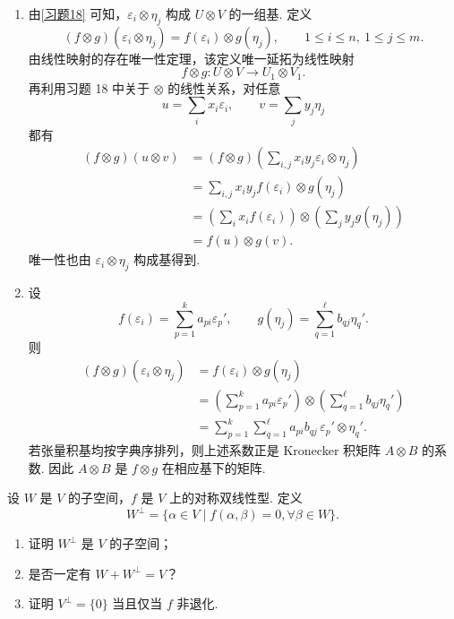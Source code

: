 \begin{solution}
	\begin{enumerate}
		\item 由\ref{习题18} 可知，$\varepsilon_i\otimes\eta_j$ 构成 $U\otimes V$ 的一组基. 定义
		\[
		(f\otimes g)(\varepsilon_i\otimes\eta_j)=f(\varepsilon_i)\otimes g(\eta_j),
		\qquad 1\le i\le n,
		\ 1\le j\le m.
		\]
		由线性映射的存在唯一性定理，该定义唯一延拓为线性映射
		\[
		f\otimes g:U\otimes V\to U_1\otimes V_1.
		\]
		再利用习题 18 中关于 $\otimes$ 的线性关系，对任意
		\[
		u=\sum_i x_i\varepsilon_i,
		\qquad
		v=\sum_j y_j\eta_j
		\]
		都有
		\[
		\begin{aligned}
			(f\otimes g)(u\otimes v)
			&=(f\otimes g)\left(\sum_{i,j}x_iy_j\varepsilon_i\otimes\eta_j\right) \\
			&=\sum_{i,j}x_iy_j f(\varepsilon_i)\otimes g(\eta_j) \\
			&=\left(\sum_i x_if(\varepsilon_i)\right)\otimes
			\left(\sum_j y_jg(\eta_j)\right) \\
			&=f(u)\otimes g(v).
		\end{aligned}
		\]
		唯一性也由 $\varepsilon_i\otimes\eta_j$ 构成基得到.
		
		\item 设
		\[
		f(\varepsilon_i)=\sum_{p=1}^k a_{pi}\varepsilon_p',
		\qquad
		g(\eta_j)=\sum_{q=1}^{\ell} b_{qj}\eta_q'.
		\]
		则
		\[
		\begin{aligned}
			(f\otimes g)(\varepsilon_i\otimes\eta_j)
			&=f(\varepsilon_i)\otimes g(\eta_j) \\
			&=\left(\sum_{p=1}^k a_{pi}\varepsilon_p'\right)
			\otimes
			\left(\sum_{q=1}^{\ell} b_{qj}\eta_q'\right) \\
			&=\sum_{p=1}^k\sum_{q=1}^{\ell} a_{pi}b_{qj}\,
			\varepsilon_p'\otimes\eta_q'.
		\end{aligned}
		\]
		若张量积基均按字典序排列，则上述系数正是 Kronecker 积矩阵 $A\otimes B$ 的系数. 因此 $A\otimes B$ 是 $f\otimes g$ 在相应基下的矩阵.
	\end{enumerate}
\end{solution}

\begin{problem}
	设 $W$ 是 $V$ 的子空间，$f$ 是 $V$ 上的对称双线性型. 定义
	\[
	W^\perp=\{\alpha\in V\mid f(\alpha,\beta)=0,
	\forall \beta\in W\}.
	\]
	\begin{enumerate}
		\item 证明 $W^\perp$ 是 $V$ 的子空间；
		\item 是否一定有 $W+W^\perp=V$？
		\item 证明 $V^\perp=\{0\}$ 当且仅当 $f$ 非退化.
	\end{enumerate}
\end{problem}

